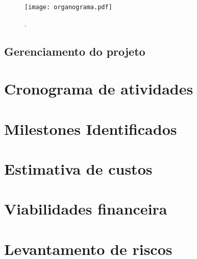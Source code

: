 \begin{figure}[h]
\centering
\texttt{[image: organograma.pdf]}
\caption{.}\label{fig:organogram}
\end{figure} 
  
\subsection{Gerenciamento do projeto} 



\section{Cronograma de atividades}
\section{Milestones Identificados}
\section{Estimativa de custos}
\section{Viabilidades financeira}
\section{Levantamento de riscos}
